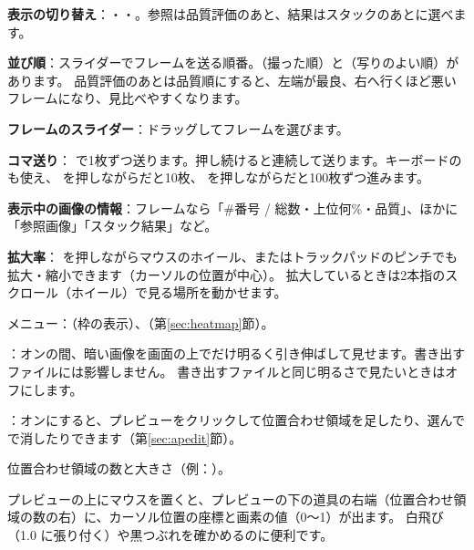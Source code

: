 
\begin{marklist}
  \item \textbf{表示の切り替え}：・・。参照は品質評価のあと、結果はスタックのあとに選べます。
  \item \textbf{並び順}：スライダーでフレームを送る順番。（撮った順）と（写りのよい順）があります。
        品質評価のあとは品質順にすると、左端が最良、右へ行くほど悪いフレームになり、見比べやすくなります。
  \item \textbf{フレームのスライダー}：ドラッグしてフレームを選びます。
  \item \textbf{コマ送り}： で1枚ずつ送ります。押し続けると連続して送ります。キーボードの  も使え、
         を押しながらだと10枚、 を押しながらだと100枚ずつ進みます。
  \item \textbf{表示中の画像の情報}：フレームなら「\#番号 / 総数・上位何\%・品質」、ほかに「参照画像」「スタック結果」など。
  \item \textbf{拡大率}： を押しながらマウスのホイール、またはトラックパッドのピンチでも拡大・縮小できます（カーソルの位置が中心）。
        拡大しているときは2本指のスクロール（ホイール）で見る場所を動かせます。
  \item {} メニュー：（枠の表示）、（第\ref{sec:heatmap}節）。
  \item {}：オンの間、暗い画像を画面の上でだけ明るく引き伸ばして見せます。書き出すファイルには影響しません。
        書き出すファイルと同じ明るさで見たいときはオフにします。
  \item {}：オンにすると、プレビューをクリックして位置合わせ領域を足したり、選んで  で消したりできます（第\ref{sec:apedit}節）。
  \item 位置合わせ領域の数と大きさ（例：）。
\end{marklist}

\begin{tip}[画素の値を見る]
  プレビューの上にマウスを置くと、プレビューの下の道具の右端（位置合わせ領域の数の右）に、カーソル位置の座標と画素の値（0〜1）が出ます。
  白飛び（1.0 に張り付く）や黒つぶれを確かめるのに便利です。
\end{tip}

